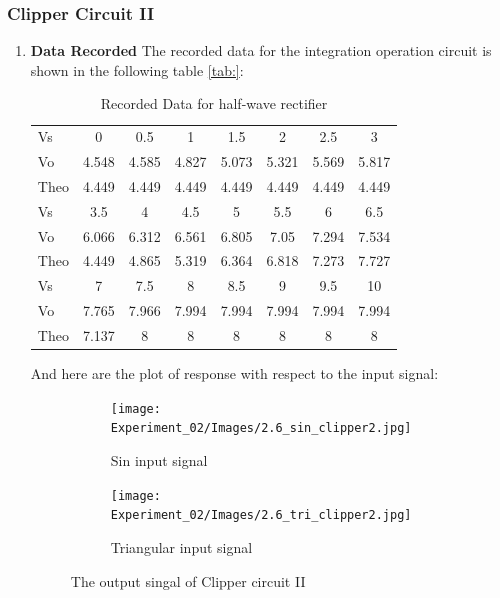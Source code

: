     \subsubsection{Clipper Circuit II}
    \begin{enumerate}[I]
        \item \textbf{Data Recorded}\newline
            The recorded data for the integration operation circuit is shown in the following table \ref{tab:}:
            \begin{table}[h]
                \centering
                \begin{tabular}{l|ccccccc}
                    \toprule
                    Vs   & 0     & 0.5   & 1     & 1.5   & 2     & 2.5   & 3     \\
                    Vo   & 4.548 & 4.585 & 4.827 & 5.073 & 5.321 & 5.569 & 5.817 \\
                    Theo & 4.449 & 4.449 & 4.449 & 4.449 & 4.449 & 4.449 & 4.449 \\
                    \midrule
                    \midrule
                    Vs   & 3.5   & 4     & 4.5   & 5     & 5.5   & 6     & 6.5   \\
                    Vo   & 6.066 & 6.312 & 6.561 & 6.805 & 7.05  & 7.294 & 7.534 \\
                    Theo & 4.449 & 4.865 & 5.319 & 6.364 & 6.818 & 7.273 & 7.727 \\
                    \midrule
                    \midrule
                    Vs   & 7     & 7.5   & 8     & 8.5   & 9     & 9.5   & 10    \\
                    Vo   & 7.765 & 7.966 & 7.994 & 7.994 & 7.994 & 7.994 & 7.994 \\
                    Theo & 7.137 & 8     & 8     & 8     & 8     & 8     & 8     \\
                    \midrule
                \end{tabular}
                    \caption{Recorded Data for half-wave rectifier}
                \label{tab:2clip2}
            \end{table}
        And here are the plot of response with respect to the input signal:
        \begin{figure}[H]
            \centering
            \begin{subfigure}{0.45\textwidth}
                \texttt{[image: Experiment\_02/Images/2.6\_sin\_clipper2.jpg]}
                \caption{Sin input signal}
                \label{wave:2cSin}
            \end{subfigure}
            \begin{subfigure}{0.45\textwidth}
                \texttt{[image: Experiment\_02/Images/2.6\_tri\_clipper2.jpg]}
                \caption{Triangular input signal}
                \label{wave:2cTri}
            \end{subfigure}
            \caption{The output singal of Clipper circuit II}
        \end{figure}
        

\end{enumerate}
